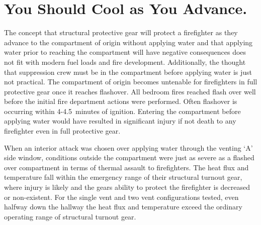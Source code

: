 \documentclass[12pt,oneside]{book}
\begin{document}
\section{You Should Cool as You Advance.} \label{tc:cool_as_you_advance}
The concept that structural protective gear will protect a firefighter as they advance to the compartment of origin without applying water and that applying water prior to reaching the compartment will have negative consequences does not fit with modern fuel loads and fire development. Additionally, the thought that suppression crew must be in the compartment before applying water is just not practical. The compartment of origin becomes untenable for firefighters in full protective gear once it reaches flashover. All bedroom fires reached flash over well before the initial fire department actions were performed. Often flashover is occurring within 4-4.5~minutes of ignition. Entering the compartment before applying water would have resulted in significant injury if not death to any firefighter even in full protective gear.

When an interior attack was chosen over applying water through the venting `A' side window, conditions outside the compartment were just as severe as a flashed over compartment in terms of thermal assault to firefighters. The heat flux and temperature fall within the emergency range of their structural turnout gear, where injury is likely and the gears ability to protect the firefighter is decreased or non-existent.  For the single vent and two vent configurations tested, even halfway down the hallway the heat flux and temperature exceed the ordinary operating range of structural turnout gear.
\end{document}
